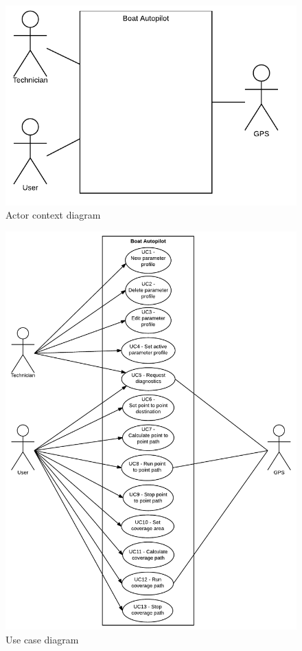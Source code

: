 \begin{figure}[H]
	\centering
	\includegraphics{Images/Requirements_specification/Actor_context_diagram}
	\caption{Actor context diagram}
\end{figure}

\begin{figure}[H]
	\centering
	\includegraphics[width=0.9\linewidth]{Images/Requirements_specification/Usecase_diagram}
	\caption{Use case diagram}
	\label{fig:usecasediagram}
\end{figure}


